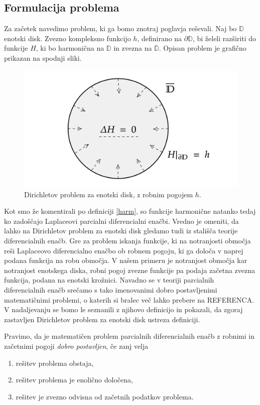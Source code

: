 \documentclass[mat1, tisk]{fmfdelo}
\begin{document}
\subsection{Formulacija problema}
    Za začetek navedimo problem, ki ga bomo znotraj poglavja reševali.
    Naj bo $\mathbb{D}$ enotski disk. Zvezno kompleksno funkcijo $h$, definirano na $\partial \mathbb{D}$, bi želeli razširiti do funkcije $H$, ki bo harmonična na $\mathbb{D}$ in zvezna na $\overline{\mathbb{D}}$.
    Opisan problem je grafično prikazan na spodnji sliki. 
    \begin{figure}[H]
        \begin{center}
            \includegraphics[width = 0.7 \textwidth]{dirichlet_form.png}
            \caption{Dirichletov problem za enotski disk, z robnim pogojem $h$.}
        \end{center}    
    \end{figure}

    Kot smo že komentirali po definiciji \ref{harm}, so funkcije harmonične natanko tedaj ko zadoščajo Laplaceovi parcialni diferencialni enačbi.   
    Vredno je omeniti, da lahko na Dirichletov problem za enotski disk gledamo tudi iz stališča teorije diferencialnih enačb. Gre za problem iskanja funkcije, ki na notranjosti območja reši Laplaceovo diferencialno enačbo ob robnem pogoju, ki ga določa v naprej podana funkcija na robu območja.     
    V našem primeru je notranjost območja kar notranjost enotskega diska, robni pogoj zvezne funkcije pa podaja začetna zvezna funkcija, podana na enotski krožnici.
    Navadno se v teoriji parcialnih diferencialnih enačb srečamo s tako imenovanimi dobro postavljenimi matematičnimi problemi, o katerih si bralec več lahko prebere na REFERENCA.     
    V nadaljevanju se bomo le seznanili z njihovo definicijo in pokazali, da zgoraj zastavljen Dirichletov problem za enotski disk ustreza definiciji. 

    \begin{definicija}[J. Hadamard]
        \label{def_dp}
        Pravimo, da je matematičen problem parcialnih diferencialnih enačb z robnimi in začetnimi pogoji \emph{dobro postavljen}, če zanj velja
        \begin{enumerate}[label={\Alph*)}]
            \item rešitev problema obstaja,
            \item rešitev problema je enolično določena,
            \item rešitev je zvezno odvisna od začetnih podatkov problema.
        \end{enumerate}
    \end{definicija}
\end{document}
